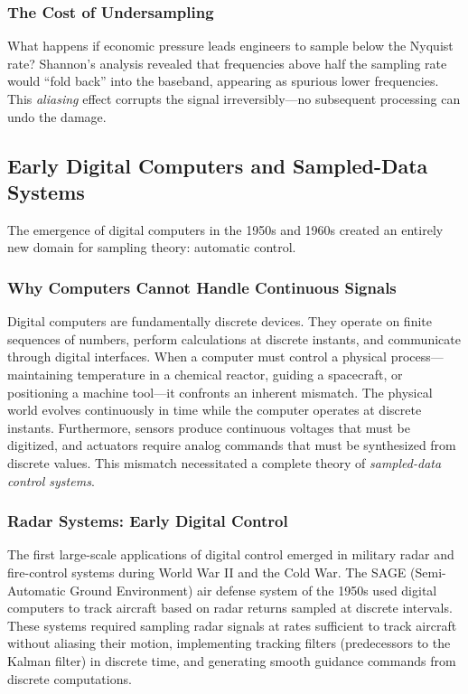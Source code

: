 \subsubsection{The Cost of Undersampling}

What happens if economic pressure leads engineers to sample below the Nyquist rate? Shannon's analysis revealed that frequencies above half the sampling rate would ``fold back'' into the baseband, appearing as spurious lower frequencies. This \textit{aliasing} effect corrupts the signal irreversibly---no subsequent processing can undo the damage.

\subsection{Early Digital Computers and Sampled-Data Systems}
\label{subsec:digital_computers}

The emergence of digital computers in the 1950s and 1960s created an entirely new domain for sampling theory: automatic control.

\subsubsection{Why Computers Cannot Handle Continuous Signals}

Digital computers are fundamentally discrete devices. They operate on finite sequences of numbers, perform calculations at discrete instants, and communicate through digital interfaces. When a computer must control a physical process---maintaining temperature in a chemical reactor, guiding a spacecraft, or positioning a machine tool---it confronts an inherent mismatch. The physical world evolves continuously in time while the computer operates at discrete instants. Furthermore, sensors produce continuous voltages that must be digitized, and actuators require analog commands that must be synthesized from discrete values. This mismatch necessitated a complete theory of \textit{sampled-data control systems}.

\subsubsection{Radar Systems: Early Digital Control}

The first large-scale applications of digital control emerged in military radar and fire-control systems during World War II and the Cold War. The SAGE (Semi-Automatic Ground Environment) air defense system of the 1950s used digital computers to track aircraft based on radar returns sampled at discrete intervals. These systems required sampling radar signals at rates sufficient to track aircraft without aliasing their motion, implementing tracking filters (predecessors to the Kalman filter) in discrete time, and generating smooth guidance commands from discrete computations.

